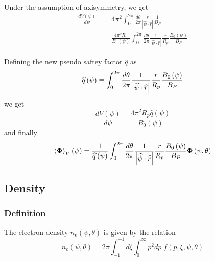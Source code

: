 Under the assumption of axisymmetry, we get
\begin{align}
\frac{dV\left( \psi\right) }{d\psi} & =4\pi^{2}\int_{0}^{2\pi}\frac{ d\theta%
}{2\pi}\frac{r}{\left| \widehat{\psi}\cdot\widehat{r}\right| }\frac{1}{B_{P}}
\\
& =\frac{4\pi^{2}R_{0}}{B_{0}\left( \psi\right) }\int_{0}^{2\pi}\frac{d\theta%
}{2\pi}\frac{1}{\left| \widehat{\psi}\cdot\widehat{r}\right| }\frac{r}{R_{p}}%
\frac{B_{0}\left( \psi\right) }{B_{P}}
\end{align}

Defining the new pseudo saftey factor $\widehat{q}$ as
\begin{equation}
\widehat{q}\left( \psi\right) \equiv\int_{0}^{2\pi}\frac{d\theta}{2\pi}\frac{
1}{\left| \widehat{\psi}\cdot\widehat{r}\right| }\frac{r}{R_{p}}\frac{%
B_{0}\left( \psi\right) }{B_{P}}
\end{equation}
we get
\begin{equation}
\frac{dV\left( \psi\right) }{d\psi}=\frac{4\pi^{2}R_{p}\widehat{q}\left(
\psi\right) }{B_{0}\left( \psi\right) }
\end{equation}
and finally
\begin{equation}
\left\langle \mathbf{\Phi}\right\rangle _{V}\left( \psi\right) =\frac {1}{%
\widehat{q}\left( \psi\right) }\int_{0}^{2\pi}\frac{d\theta}{2\pi}\frac{1}{%
\left| \widehat{\psi}\cdot\widehat{r}\right| }\frac{r}{R_{p}}\frac{
B_{0}\left( \psi\right) }{B_{P}}\mathbf{\Phi}\left( \psi ,\theta\right)
\label{volfluxsurfav}
\end{equation}

\subsection{Density}

\subsubsection{Definition}

The electron density $n_{e}\left( \psi,\theta\right) $ is given by the
relation
\begin{equation}
n_{e}\left( \psi,\theta\right)
=2\pi\int_{-1}^{+1}d\xi\int_{0}^{\infty}p^{2}dp\;f\left(
p,\xi,\psi,\theta\right)
\end{equation}

